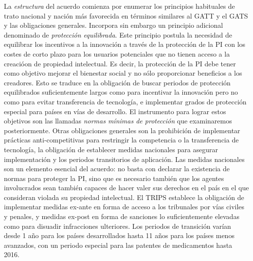 \documentclass{nuevotema}
\begin{document}
La \textit{estructura} del acuerdo comienza por enumerar los principios habituales de trato nacional y nación más favorecida en términos similares al GATT y el GATS y las obligaciones generales. Incorpora sin embargo un principio adicional denominado de \textit{protección equilibrada}. Este principio postula la necesidad de equilibrar los incentivos a la innovación a través de la protección de la PI con los costes de corto plazo para los usuarios potenciales que no tienen acceso a la creacióon de propiedad intelectual. Es decir, la protección de la PI debe tener como objetivo mejorar el bienestar social y no sólo proporcionar beneficios a los creadores. Esto se traduce en la obligación de buscar periodos de protección equilibrados suficientemente largos como para incentivar la innovación pero no como para evitar transferencia de tecnología, e implementar grados de protección especial para países en vías de desarrollo. El instrumento para lograr estos objetivos son las llamadas \textit{normas mínimas de protección} que examinaremos posteriormente. Otras obligaciones generales son la prohibición de implementar prácticas anti-competitivas para restringir la competencia o la transferencia de tecnología, la obligación de establecer medidas nacionales para asegurar implementación y los periodos transitorios de aplicación. Las medidas nacionales son un elemento esencial del acuerdo: no basta con declarar la existencia de normas para proteger la PI, sino que es necesario también que los agentes involucrados sean también capaces de hacer valer sus derechos en el país en el que consideran violada su propiedad intelectual. El TRIPS establece la obligación de implementar medidas ex-ante en forma de acceso a los tribunales por vías civiles y penales, y medidas ex-post en forma de sanciones lo suficientemente elevadas como para disuadir infracciones ulteriores. Los periodos de transición varían desde 1 año para los países desarrollados hasta 11 años para los países menos avanzados, con un periodo especial para las patentes de medicamentos hasta 2016. 
\end{document}
